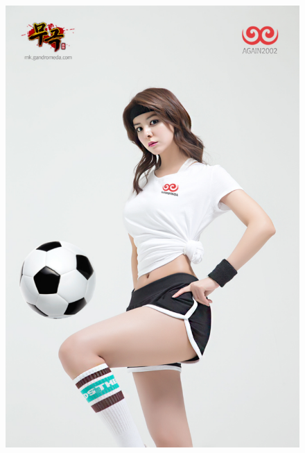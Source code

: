 		
			\clearpage
			\begin{figure}
			\centering
			\includegraphics[width=1\paperwidth]{./fig/8.pdf}
			\end{figure}
			\clearpage
		
